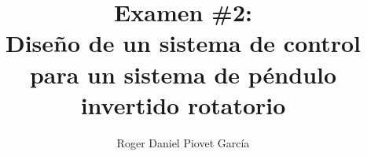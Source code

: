 %
{}
\title{Examen \#2:\\ Diseño de un sistema de control para un sistema de péndulo invertido rotatorio}
\author{Roger Daniel Piovet García}
\maketitle
